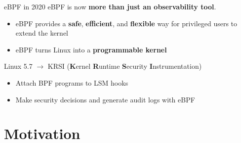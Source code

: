 \documentclass[12pt, dvipsnames]{beamer}
\begin{document}
\begin{frame}[c]{eBPF in 2020}
eBPF is now \textbf{more than just an observability tool}.
\begin{itemize}
    \item eBPF provides a \textbf{safe}, \textbf{efficient}, and \textbf{flexible} way for privileged users to extend the kernel
    \item eBPF turns Linux into a \textbf{programmable kernel}
\end{itemize}
\vfill
Linux 5.7 $\rightarrow$ KRSI (\textbf{K}ernel \textbf{R}untime \textbf{S}ecurity \textbf{I}nstrumentation)
\begin{itemize}
    \item Attach BPF programs to LSM hooks
    \item Make security decisions and generate audit logs with eBPF
\end{itemize}
\end{frame}

\section{Motivation}

\end{document}
